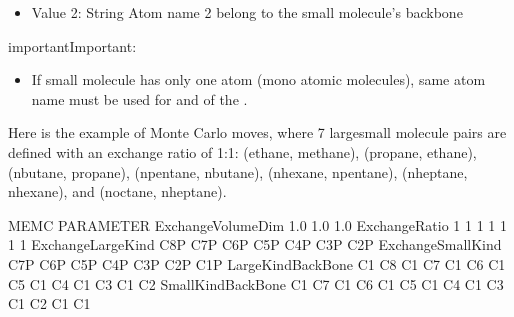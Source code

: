 \documentclass[letterpaper,10pt,english]{sphinxmanual}
\begin{document}
\begin{description}
\begin{itemize}
\item {} 
Value 2: String \sphinxhyphen{} Atom name 2 belong to the small molecule’s backbone

\end{itemize}

\begin{sphinxadmonition}{important}{Important:}\begin{itemize}
\item {} 
If small molecule has only one atom (mono atomic molecules), same atom name must be used for  and  of the .

\end{itemize}
\end{sphinxadmonition}

\end{description}

Here is the example of  Monte Carlo moves, where 7 large\sphinxhyphen{}small molecule pairs are defined with an exchange ratio of 1:1: (ethane, methane), (propane, ethane), (n\sphinxhyphen{}butane, propane), (n\sphinxhyphen{}pentane, nbutane), (n\sphinxhyphen{}hexane, n\sphinxhyphen{}pentane), (n\sphinxhyphen{}heptane, n\sphinxhyphen{}hexane), and (noctane, n\sphinxhyphen{}heptane).

\begin{sphinxVerbatim}[commandchars=\\\{\}]
\PYGZsh{}\PYGZsh{}\PYGZsh{}\PYGZsh{}\PYGZsh{}\PYGZsh{}\PYGZsh{}\PYGZsh{}\PYGZsh{}\PYGZsh{}\PYGZsh{}\PYGZsh{}\PYGZsh{}\PYGZsh{}\PYGZsh{}\PYGZsh{}\PYGZsh{}\PYGZsh{}\PYGZsh{}\PYGZsh{}\PYGZsh{}\PYGZsh{}\PYGZsh{}\PYGZsh{}\PYGZsh{}\PYGZsh{}\PYGZsh{}\PYGZsh{}\PYGZsh{}\PYGZsh{}\PYGZsh{}\PYGZsh{}\PYGZsh{}\PYGZsh{}\PYGZsh{}\PYGZsh{}\PYGZsh{}\PYGZsh{}\PYGZsh{}\PYGZsh{}\PYGZsh{}\PYGZsh{}\PYGZsh{}\PYGZsh{}\PYGZsh{}\PYGZsh{}\PYGZsh{}\PYGZsh{}\PYGZsh{}\PYGZsh{}\PYGZsh{}\PYGZsh{}\PYGZsh{}\PYGZsh{}\PYGZsh{}\PYGZsh{}\PYGZsh{}\PYGZsh{}\PYGZsh{}\PYGZsh{}\PYGZsh{}\PYGZsh{}\PYGZsh{}\PYGZsh{}\PYGZsh{}\PYGZsh{}\PYGZsh{}\PYGZsh{}\PYGZsh{}\PYGZsh{}
\PYGZsh{} MEMC PARAMETER
\PYGZsh{}\PYGZsh{}\PYGZsh{}\PYGZsh{}\PYGZsh{}\PYGZsh{}\PYGZsh{}\PYGZsh{}\PYGZsh{}\PYGZsh{}\PYGZsh{}\PYGZsh{}\PYGZsh{}\PYGZsh{}\PYGZsh{}\PYGZsh{}\PYGZsh{}\PYGZsh{}\PYGZsh{}\PYGZsh{}\PYGZsh{}\PYGZsh{}\PYGZsh{}\PYGZsh{}\PYGZsh{}\PYGZsh{}\PYGZsh{}\PYGZsh{}\PYGZsh{}\PYGZsh{}\PYGZsh{}\PYGZsh{}\PYGZsh{}\PYGZsh{}\PYGZsh{}\PYGZsh{}\PYGZsh{}\PYGZsh{}\PYGZsh{}\PYGZsh{}\PYGZsh{}\PYGZsh{}\PYGZsh{}\PYGZsh{}\PYGZsh{}\PYGZsh{}\PYGZsh{}\PYGZsh{}\PYGZsh{}\PYGZsh{}\PYGZsh{}\PYGZsh{}\PYGZsh{}\PYGZsh{}\PYGZsh{}\PYGZsh{}\PYGZsh{}\PYGZsh{}\PYGZsh{}\PYGZsh{}\PYGZsh{}\PYGZsh{}\PYGZsh{}\PYGZsh{}\PYGZsh{}\PYGZsh{}\PYGZsh{}\PYGZsh{}\PYGZsh{}\PYGZsh{}
ExchangeVolumeDim   1.0   1.0   1.0
ExchangeRatio       1       1       1      1      1      1      1
ExchangeLargeKind   C8P    C7P    C6P    C5P    C4P    C3P    C2P
ExchangeSmallKind   C7P    C6P    C5P    C4P    C3P    C2P    C1P
LargeKindBackBone   C1 C8  C1 C7  C1 C6  C1 C5  C1 C4  C1 C3  C1 C2
SmallKindBackBone   C1 C7  C1 C6  C1 C5  C1 C4  C1 C3  C1 C2  C1 C1
\end{sphinxVerbatim}
\end{document}
